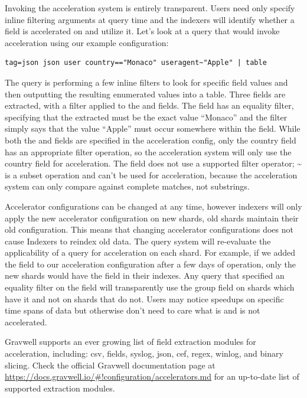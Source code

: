 {Invoking the acceleration system is entirely transparent. Users need
only specify inline filtering arguments at query time and the indexers
will identify whether a field is accelerated on and utilize it. Let's
look at a query that would invoke acceleration using our example
configuration:

\begin{Verbatim}[breaklines=true]
tag=json json user country=="Monaco" useragent~"Apple" | table
\end{Verbatim}

The query is performing a few inline filters to look for specific field
values and then outputting the resulting enumerated values into a table.
Three fields are extracted, with a filter applied to the
 and  fields. The  field has an
equality filter, specifying that the extracted  must be the
exact value ``Monaco'' and the  filter simply says that the
value ``Apple'' must occur somewhere within the  field.
While both the  and  fields are specified in the
acceleration config, only the country field has an appropriate
filter operation, so the acceleration system will only use the
country field for acceleration. The  field does not
use a supported filter operator; \textasciitilde{} is a subset operation and can't
be used for acceleration, because the acceleration system can only compare
against complete matches, not substrings.

Accelerator configurations can be changed at any time, however indexers
will only apply the new accelerator configuration on new shards, old
shards maintain their old configuration. This means that changing
accelerator configurations does not cause Indexers to reindex old data.
The query system will re-evaluate the applicability of a query for
acceleration on each shard. For example, if we added the field
 to our acceleration configuration after a few days of
operation, only the new shards would have the field in their indexes.
Any query that specified an equality filter on the  field will
transparently use the group field on shards which have it and not on shards
that do not. Users may notice speedups on specific time spans of data
but otherwise don't need to care what is and is not accelerated.

Gravwell supports an ever growing list of field extraction modules for
acceleration, including: csv, fields, syslog, json, cef, regex, winlog,
and binary slicing. Check the official Gravwell documentation page at
\href{https://docs.gravwell.io/\#!configuration/accelerators.md}{https://docs.gravwell.io/\#!configuration/accelerators.md} for
an up-to-date list of supported extraction modules.

}
